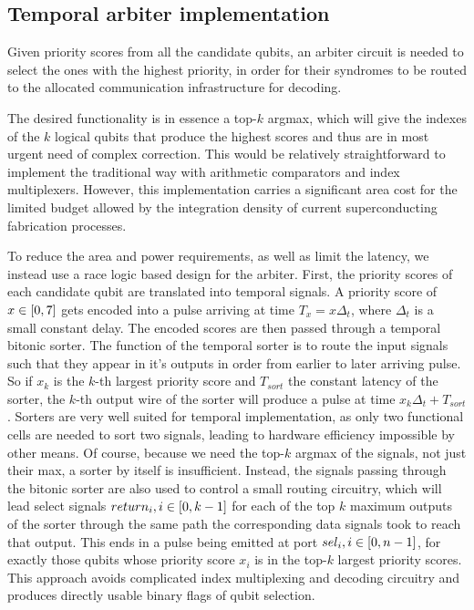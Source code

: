 \documentclass{article}
\begin{document}
\subsection{Temporal arbiter implementation}

Given priority scores from all the candidate qubits, an
arbiter circuit is needed to select the ones with the
highest priority, in order for their syndromes to be routed
to the allocated communication infrastructure for decoding.

The desired functionality is in essence a top-$k$ argmax,
which will give the indexes of the $k$ logical qubits that
produce the highest scores and thus are in most urgent need
of complex correction. This would be relatively
straightforward to implement the traditional way with
arithmetic comparators and index multiplexers. However, this
implementation carries a significant area cost for the
limited budget allowed by the integration density of current
superconducting fabrication processes.

To reduce the area and power requirements, as well as limit
the latency, we instead use a race logic based design for
the arbiter. First, the priority scores of each candidate
qubit are translated into temporal signals. A priority score
of $x \in \interval{0}{7}$ gets encoded into a pulse
arriving at time $T_x = x {\Delta}_t$, where ${\Delta}_t$ is
a small constant delay. The encoded scores are then passed
through a temporal bitonic sorter. The function of the
temporal sorter is to route the input signals such that they
appear in it's outputs in order from earlier to later
arriving pulse. So if $x_k$ is the $k$-th largest priority
score and $T_{sort}$ the constant latency of the sorter, the
$k$-th output wire of the sorter will produce a pulse at
time $x_k {\Delta}_t + T_{sort}$. Sorters are very well
suited for temporal implementation, as only two functional
cells are needed to sort two signals, leading to hardware
efficiency impossible by other means. Of course, because we
need the top-$k$ argmax of the signals, not just their max,
a sorter by itself is insufficient. Instead, the signals
passing through the bitonic sorter are also used to control
a small routing circuitry, which will lead select signals
$return_i, i \in \interval{0}{k-1}$ for each of the top $k$
maximum outputs of the sorter through the same path the
corresponding data signals took to reach that output. This
ends in a pulse being emitted at port $sel_i, i \in
\interval{0}{n-1}$, for exactly those qubits whose priority
score $x_i$ is in the top-$k$ largest priority scores. This
approach avoids complicated index multiplexing and decoding
circuitry and produces directly usable binary flags of qubit
selection.
\end{document}
